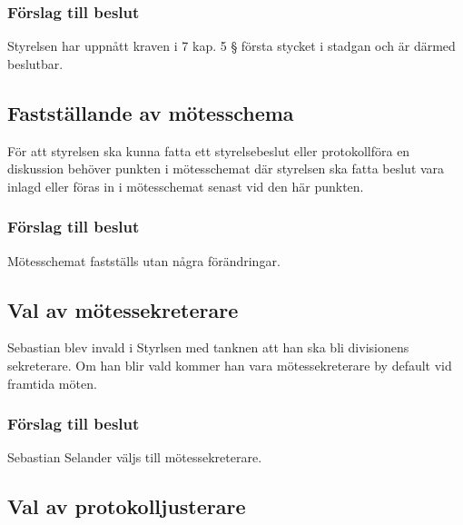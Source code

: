 \documentclass[protokoll]{dvd}
\begin{document}
\subsubsection*{Förslag till beslut}

\begin{attsatser}
    \item Styrelsen har uppnått kraven i 7 kap. 5 § första stycket i stadgan och är därmed beslutbar.
\end{attsatser}

\subsection{Fastställande av mötesschema}

För att styrelsen ska kunna fatta ett styrelsebeslut eller protokollföra en diskussion behöver punkten i mötesschemat där styrelsen ska fatta beslut vara inlagd eller föras in i mötesschemat senast vid den här punkten.

\subsubsection*{Förslag till beslut}

\begin{attsatser}
    \item Mötesschemat fastställs utan några förändringar.
\end{attsatser}

\subsection{Val av mötessekreterare}

Sebastian blev invald i Styrlsen med tanknen att han ska bli divisionens sekreterare.
Om han blir vald kommer han vara mötessekreterare by default vid framtida möten.

\subsubsection*{Förslag till beslut}

\begin{attsatser}
    \item Sebastian Selander väljs till mötessekreterare.
\end{attsatser}

\subsection{Val av protokolljusterare}
\end{document}
